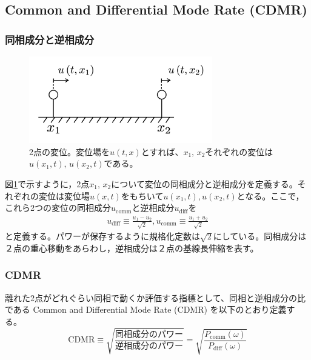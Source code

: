 \documentclass[a4paper,12pt]{jsarticle}
\begin{document}
\subsection{Common and Differential Mode Rate (CDMR)}
\subsubsection{同相成分と逆相成分}
\begin{figure}[H]
  \begin{center}
    \includegraphics[width=8.0cm]{./img_cdmr_xarm.png}
  \end{center}
  \caption{2点の変位。変位場を$u(t,x)$とすれば、$x_1,\,x_2$それぞれの変位は$u(x_1,t),\,u(x_2,t)$である。}\label{img:img_diffcomm}
\end{figure}

図\ref{img:img_diffcomm}で示すように，2点$x_1,\,x_2$について変位の同相成分と逆相成分を定義する。それぞれの変位は変位場$u(x,t)$をもちいて$u(x_1,t),u(x_2,t)$となる。ここで，これら2つの変位の同相成分$u_{\mathrm{comm}}$と逆相成分$u_\mathrm{diff}$を
\begin{eqnarray}\label{eq:eq22}
  u_{\mathrm{diff}} \equiv \frac{u_{1}-u_{2}}{\sqrt{2}},
  u_{\mathrm{comm}}  \equiv \frac{u_{1}+u_{2}}{\sqrt{2}}
\end{eqnarray}
と定義する。パワーが保存するように規格化定数は$\sqrt{2}$にしている。同相成分は２点の重心移動をあらわし，逆相成分は２点の基線長伸縮を表す。
\subsubsection{CDMR}
離れた2点がどれぐらい同相で動くか評価する指標として、同相と逆相成分の比である Common and Differential Mode Rate (CDMR) を以下のとおり定義する。
\begin{equation}
  \boxed{\mathrm{CDMR} \equiv \sqrt{\frac{同相成分のパワー}{逆相成分のパワー}} = \sqrt{\frac{P_{\mathrm{comm}}(\omega)}{P_{\mathrm{diff}}(\omega)}}} \label{eq:eq23}
\end{equation}
\end{document}
